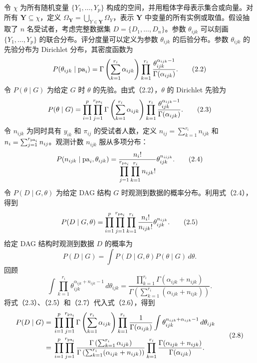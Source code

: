 令 $\chi$ 为所有随机变量 $\{Y_1,\ldots,Y_p\}$ 构成的空间，并用粗体字母表示集合或向量。对所有 $\mathbf Y\subseteq\chi$，定义 $\Omega_{\mathbf Y}=\bigcup_{Y\in\mathbf Y}\Omega_Y$，表示 $\mathbf Y$ 中变量的所有实例或取值。假设抽取了 $n$ 名受试者，考虑完整数据集 $D=\{D_1,\ldots,D_n\}$。参数 $\theta_{ijk}$ 可以刻画 $\{Y_1,\ldots,Y_p\}$ 的联合分布。评分度量可以定义为参数 $\theta_{ijk}$ 的后验分布。参数 $\theta_{ijk}$ 的先验分布为 Dirichlet 分布，其密度函数为
\begin{equation}
P(\theta_{ijk}\mid\mathrm{pa}_i)
 =\Gamma\left(\sum_{k=1}^{r_i}\alpha_{ijk}\right)
 \prod_{k=1}^{r_i}\frac{\theta_{ijk}^{\alpha_{ijk}-1}}{\Gamma(\alpha_{ijk})}.
\tag{2.2}
\end{equation}
令 $P(\theta\mid G)$ 为给定 $G$ 时 $\theta$ 的先验。由式（2.2），$\theta$ 的 Dirichlet 先验为
\begin{equation}
P(\theta\mid G)=
\prod_{i=1}^{p}\prod_{j=1}^{r_{\mathrm{pa}_i}}
\Gamma\left(\sum_{k=1}^{r_i}\alpha_{ijk}\right)
\prod_{k=1}^{r_i}\frac{\theta_{ijk}^{\alpha_{ijk}-1}}{\Gamma(\alpha_{ijk})}.
\tag{2.3}
\end{equation}
令 $n_{ijk}$ 为同时具有 $y_{ik}$ 和 $\pi_{ij}$ 的受试者人数，定义 $n_{ij}=\sum_{k=1}^{r_i}n_{ijk}$ 和 $n_i=\sum_{j=1}^{r_{\mathrm{pa}_i}}n_{ij}$。观测计数 $n_{ijk}$ 服从多项分布：
\begin{equation}
P(n_{ijk}\mid\mathrm{pa}_i,\theta_{ijk})
 =\frac{n_i!}{\displaystyle\prod_{j=1}^{r_{\mathrm{pa}_i}}\prod_{k=1}^{r_i}n_{ijk}!}
 \theta_{ijk}^{n_{iijk}}.
\tag{2.4}
\end{equation}
令 $P(D\mid G,\theta)$ 为给定 DAG 结构 $G$ 时观测到数据的概率分布。利用式（2.4），得到
\begin{equation}
P(D\mid G,\theta)=
\prod_{i=1}^{p}\prod_{j=1}^{r_{\mathrm{pa}_i}}\prod_{k=1}^{r_i}
\frac{n_i!}{n_{ijk}!}\theta_{ijk}^{n_{ijk}}.
\tag{2.5}
\end{equation}
给定 DAG 结构时观测到数据 $D$ 的概率为
\begin{equation}
P(D\mid G)=\int P(D\mid G,\theta)P(\theta\mid G)\,d\theta.
\tag{2.6}
\end{equation}
回顾
\begin{equation}
\int\prod_{k=1}^{r_i}\theta_{ijk}^{\alpha_{ijk}+n_{ijk}-1}\,d\theta_{ijk}
 =\frac{\displaystyle\prod_{k=1}^{r_i}\Gamma(\alpha_{ijk}+n_{ijk})}
 {\displaystyle\Gamma\left(\sum_{k=1}^{r_i}(\alpha_{ijk}+n_{ijk})\right)}.
\tag{2.7}
\end{equation}
将式（2.3）、（2.5）和（2.7）代入式（2.6），得到
\begin{equation}
\begin{aligned}
P(D\mid G)
={}&\prod_{i=1}^{p}\prod_{j=1}^{r_{\mathrm{pa}_i}}
\Gamma\left(\sum_{k=1}^{r_i}\alpha_{ijk}\right)
\prod_{k=1}^{r_i}\frac1{\Gamma(\alpha_{ijk})}
\int\theta_{ijk}^{n_{ijk}+\alpha_{ijk}-1}\,d\theta_{ijk}\\
={}&\prod_{i=1}^{p}\prod_{j=1}^{r_{\mathrm{pa}_i}}
\frac{\Gamma\left(\sum_{k=1}^{r_i}\alpha_{ijk}\right)}
{\Gamma\left(\sum_{k=1}^{r_i}(\alpha_{ijk}+n_{ijk})\right)}
\prod_{k=1}^{r_i}\frac{\Gamma(\alpha_{ijk}+n_{ijk})}{\Gamma(\alpha_{ijk})}.
\end{aligned}\tag{2.8}
\end{equation}
